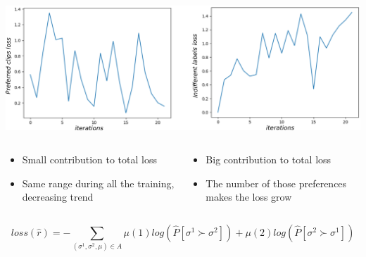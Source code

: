 \begin{frame}{}
\centering
\includegraphics[width=1\linewidth]{images/bothlosses.png}

\begin{adjustwidth}{-2em}{-2em}
    \begin{columns}
        \begin{column}{0.5\textwidth}
        \small{        
            \begin{itemize}
                \item Small contribution to total loss
                \item Same range during all the training, decreasing trend
            \end{itemize}
        }
            
        \end{column}
        \begin{column}{0.5\textwidth}
        \small{
            \begin{itemize}
                \item Big contribution to total loss
                \item The number of those preferences makes the loss grow
            \end{itemize}
        }
        
        \end{column}
        
    \end{columns}
\end{adjustwidth}

\begin{equation*}
loss(\hat{r}) = - \sum_{(\sigma^1,\sigma^2,\mu)\in A} \mu(1)log(\hat{P}[\sigma^1 \succ \sigma^2]) + \mu(2)log(\hat{P}[\sigma^2 \succ \sigma^1])
\end{equation*}

\end{frame}

